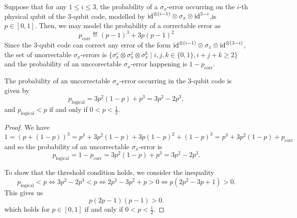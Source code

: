 \documentclass[a4paper, oneside, 12pt]{amsart}
\begin{document}
Suppose that for any \(1\leq i \leq 3\), the probability  of a \(\sigma_{x}\)-error occurring on the  \(i\)-th physical qubit of the \(3\)-qubit code, modelled by \(\mathrm{id}^{\otimes(i-1)}\otimes \sigma_{x}\otimes \mathrm{id}^{3-i}\),is \(p \in [0,1]\).
Then, we may model the probability of a correctable error as
\begin{equation*}
  p_{\mathrm{corr}} \eqdef (p-1)^{3} + 3p(p-1)^{2}
\end{equation*}
Since the 3-qubit code can correct any error of the form \(\mathrm{id}^{\otimes (i-1)} \otimes \sigma_{z}\otimes \mathrm{id}^{\otimes (3-i)} \), the set of unorrectable \(\sigma_{x}\)-errors is \(\{\sigma_{x}^{i} \otimes \sigma_{x}^{j} \otimes \sigma_{x}^{k} \mid i,j,k \in\{0, 1\}, i+j+k \geq 2\}\) and the probability of an unccorectable \(\sigma_{x}\)-error happening is \(1- p_{\mathrm{corr}}\).
\begin{proposition}\label{prop:threshold-for-3-qubit-code-x-error}
  The probability of an uncorrectable \(\sigma_{x}\)-error occurring in the \(3\)-qubit code is given by
  \begin{equation}
    p_{\mathrm{logical}} = 3p^{2}(1-p) + p^{3} = 3p^2 - 2p^3,
  \end{equation}
  and \(p_{\mathrm{logical}} < p\) if and only if \(0< p < \frac{1}{2}\).
\end{proposition}
\begin{proof}
  We have
  \begin{equation*}
    1
    = (p + (1-p))^{3}
    = p^{3} + 3 p^{2}(1-p) + 3p(1-p)^{2} + (1-p)^{3}
    = p^{3} + 3 p^{2}(1-p) + p_{\mathrm{corr}}
  \end{equation*}
  and so the probability of an uncorrectable \(\sigma_{x}\)-error is
  \begin{equation*}
    p_{\mathrm{logical}} = 1 - p_{\mathrm{corr}} = 3p^{2}(1-p) + p^{3} = 3p^2 - 2p^3.
  \end{equation*}


  To show that the threshold condition holds, we consider the inequality
  \begin{equation*}
    p_{\mathrm{logical}} < p
    \iff 3p^2 - 2p^3 < p
    \iff 2p^3 - 3p^2 + p > 0
    \iff p(2p^2 - 3p + 1) > 0.
  \end{equation*}
  This gives us
  \begin{equation*}
    p(2p - 1)(p - 1) > 0.
  \end{equation*}
  which holds for \(p\in [0, 1]\) if and only if \(0<p<\tfrac{1}{2}\).
\end{proof}
\end{document}
